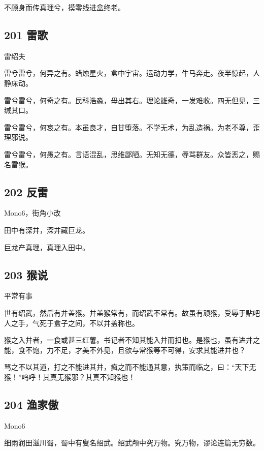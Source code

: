 不顾身而传真理兮，摸零线进盒终老。

\hypertarget{ux96f7ux6b4c}{%
\subsection{201 雷歌}\label{ux96f7ux6b4c}}

雷绍夫

雷兮雷兮，何异之有。蜡烛星火，盒中宇宙。运动力学，牛马奔走。夜半惊起，人静床动。

雷兮雷兮，何奇之有。民科浩淼，毋出其右。理论雄奇，一发难收。四无但见，三缄其口。

雷兮雷兮，何哀之有。本虽良才，自甘堕落。不学无术，为乱造祸。为老不尊，歪理邪说。

雷兮雷兮，何愚之有。言语混乱，思维鄙陋。无知无德，辱骂群友。众皆恶之，赐名雷猴。

\hypertarget{ux53cdux96f7-7}{%
\subsection{202 反雷}\label{ux53cdux96f7-7}}

Mono6，街角小改

田中有深井，深井藏巨龙。

巨龙产真理，真理入田中。

\hypertarget{ux7334ux8bf4}{%
\subsection{203 猴说}\label{ux7334ux8bf4}}

平常有事

世有绍武，然后有井盖猴。井盖猴常有，而绍武不常有。故虽有顽猴，受辱于贴吧人之手，气死于盒子之间，不以井盖称也。

猴之入井者，一食或甚三红薯。书记者不知其能入井而扣也。是猴也，虽有进井之能，食不饱，力不足，才美不外见，且欲与常猴等不可得，安求其能进井也？

骂之不以其道，打之不能进其井，疯之而不能通其意，执策而临之，曰：``天下无猴！''呜呼！其真无猴邪？其真不知猴也！

\hypertarget{ux6e14ux5bb6ux50b2-1}{%
\subsection{204 渔家傲}\label{ux6e14ux5bb6ux50b2-1}}

Mono6

细雨润田滋川蜀，蜀中有叟名绍武。绍武颅中究万物。究万物，谬论连篇无穷数。

